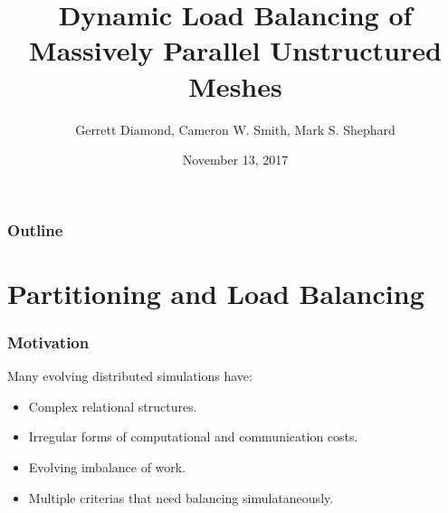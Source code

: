 \documentclass{beamer}
\begin{document}
\title[Unstructured Mesh Workflows]
{
Dynamic Load Balancing of Massively Parallel Unstructured Meshes
}
\author{Gerrett Diamond, Cameron W. Smith, Mark S. Shephard}


\date{November 13, 2017}

\begin{frame}[plain]
  \titlepage
\end{frame}

\begin{frame}
  \frametitle{Outline}
  \tableofcontents
\end{frame}

\section{Partitioning and Load Balancing}
\begin{frame}
  \frametitle{Motivation}
  Many evolving distributed simulations have: \\
  \begin{itemize}
    \item Complex relational structures.
    \item Irregular forms of computational and communication costs.
    \item Evolving imbalance of work. %
    \item Multiple criterias that need balancing simulataneously.
  \end{itemize}
\end{frame}
\end{document}
